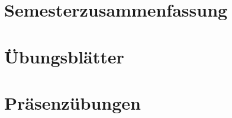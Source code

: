 \documentclass[11pt, oneside, ngerman]{report}
\begin{document}
    
    

    \clearpage
    \thispagestyle{empty}

    
    

    \clearpage
    \tableofcontents

    \clearpage

    \part{Semesterzusammenfassung}

    
    
    
    
    
    
    
    
    
    
    
    

    \part{Übungsblätter}

    
    
    
    
    
    
    
    

    \part{Präsenzübungen}

    
    
    
    
    
    
    
    
    
\end{document}
